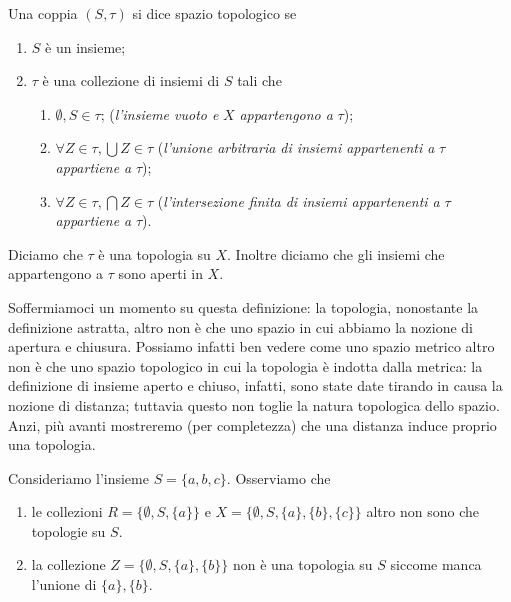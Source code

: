 \begin{definition}
    Una coppia $(S, \tau)$ si dice spazio topologico se
    \begin{enumerate}[label=\protect\circled{\arabic*}]
        \item $S$ è un insieme;
        \item $\tau$ è una collezione di insiemi di $S$ tali che
        \begin{enumerate}
            \item $\emptyset, S \in \tau$; (\emph{l'insieme vuoto e } $X$ \emph{ appartengono a } $\tau$);
            \item $\forall Z \in \tau, \bigcup Z \in \tau$ (\emph{l'unione arbitraria di insiemi appartenenti a } $\tau$ \emph{ appartiene a } $\tau$);
            \item $\forall Z \in \tau, \bigcap Z \in \tau$ (\emph{l'intersezione finita di insiemi appartenenti a } $\tau$ \emph{ appartiene a } $\tau$).
        \end{enumerate}
    \end{enumerate}
    Diciamo che $\tau$ è una topologia su $X$. Inoltre diciamo che gli insiemi che appartengono a $\tau$ sono aperti in $X$. 
    \label{def:topological_space}
\end{definition}

Soffermiamoci un momento su questa definizione: la topologia, nonostante la definizione astratta, altro non è che uno spazio in cui abbiamo la nozione di apertura e chiusura. Possiamo infatti ben vedere come uno spazio metrico
altro non è che uno spazio topologico in cui la topologia è indotta dalla metrica: la definizione di insieme aperto e chiuso, infatti, sono state date tirando in causa la nozione di distanza; tuttavia questo non toglie la natura
topologica dello spazio. Anzi, più avanti mostreremo (per completezza) che una distanza induce proprio una topologia. \\
\begin{example}
    Consideriamo l'insieme $S = \{a,b,c \}$. Osserviamo che
    \begin{enumerate}[label=\protect\circled{\arabic*}]
        \item le collezioni $R = \{\emptyset, S, \{a \} \}$ e $X = \{ \emptyset, S, \{a\}, \{b\}, \{c\} \}$ altro non sono che topologie su $S$.
        \item la collezione $Z = \{\emptyset, S, \{ a \}, \{ b \} \}$ non è una topologia su $S$ siccome manca l'unione di $\{ a \}, \{ b \}$.
    \end{enumerate}
\end{example}

